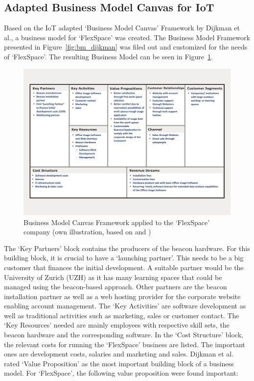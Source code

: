 	\subsection{Adapted Business Model Canvas for IoT}
		Based on the IoT adapted `Business Model Canvas' Framework by Dijkman et al., a business model for `FlexSpace' was created. The Business Model Framework presented in Figure~\ref{fig:bm_dijkman} was filed out and customized for the needs of `FlexSpace'. The resulting Business Model can be seen in Figure~\ref{fig:bmc_flex}.
			\begin{figure}[ht]
			    \begin{center}
			    \includegraphics[scale=0.4]{Talk11/use_case_dijkman.pdf}
			    \end{center}
			    \caption{Business Model Canvas Framework applied to the `FlexSpace' company (own illustration, based on \cite{dijkman} and \cite{bmc})}
			    \label{fig:bmc_flex}
			\end{figure}
		The `Key Partners' block contains the producers of the beacon hardware. For this building block, it is crucial to have a `launching partner'. This needs to be a big customer that finances the initial development. A suitable partner would be the University of Zurich (UZH) as it has many learning spaces that could be managed using the beacon-based approach. Other partners are the beacon installation partner as well as a web hosting provider for the corporate website enabling account management. The `Key Activities' are software development as well as traditional activities such as marketing, sales or customer contact. The `Key Resources' needed are mainly employees with respective skill sets, the beacon hardware and the corresponding software. In the `Cost Structure' block, the relevant costs for running the `FlexSpace' business are listed. The important ones are development costs, salaries and marketing and sales. Dijkman et al. \cite{dijkman} rated `Value Proposition' as the most important building block of a business model. For `FlexSpace', the following value proposition were found important:

